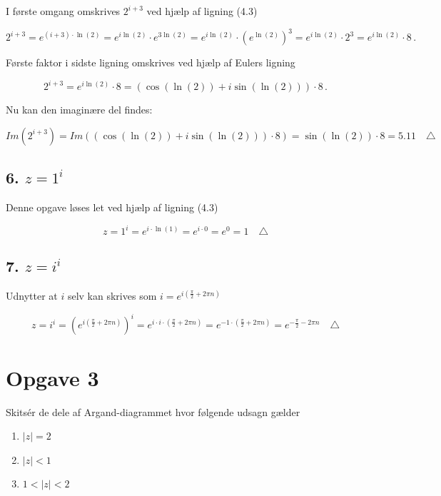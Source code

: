 \documentclass[a4paper, 12pt]{article}
\begin{document}
I første omgang omskrives \(2^{i+3}\) ved hjælp af ligning (4.3)

$$2^{i+3} = e^{(i+3) \cdot \ln(2)} = e^{i \ln(2)} \cdot e^{3 \ln(2)}=e^{i \ln(2)} \cdot \left(e^{\ln(2)}\right)^3 = e^{i\ln(2)} \cdot 2^3 =e^{i\ln(2)} \cdot 8\,.$$

Første faktor i sidste ligning omskrives ved hjælp af Eulers ligning

$$2^{i+3} = e^{i \ln(2)} \cdot 8 = \left(\cos\left(\ln(2)\right) + i \sin\left(\ln(2)\right)\right) \cdot 8 \,.$$

Nu kan den imaginære del findes:

$$Im\left(2^{i+3}\right) = Im\left( \left(\cos\left(\ln(2)\right) + i \sin\left(\ln(2)\right)\right) \cdot 8 \right) = \sin(\ln(2))\cdot 8 = 5.11\quad \triangle$$

\subsection*{6. \(z=1^i\)}
\label{sec:org3146d52}

Denne opgave løses let ved hjælp af ligning (4.3)

$$z = 1^i = e^{i \cdot \ln(1)} = e^{i \cdot 0 }= e^{0} = 1 \quad \triangle$$

\subsection*{7. \(z=i^i\)}
\label{sec:org11b6a1a}

Udnytter at \(i\) selv kan skrives som \(i=e^{i \left(\frac{\pi}{2} + 2 \pi n\right)}\)

$$z=i^i= \left(e^{i \left(\frac{\pi}{2} + 2 \pi n\right)}\right)^i = e^{i \cdot i\cdot \left( \frac{\pi}{2} + 2 \pi n\right)} = e^{-1\cdot \left( \frac{\pi}{2} + 2 \pi n\right)}=e^{-\frac{\pi}{2} - 2 \pi n}\quad \triangle$$

\section*{Opgave 3}
\label{sec:orgdac9df4}

Skitsér de dele af Argand-diagrammet hvor følgende udsagn gælder

\begin{enumerate}
\item \(|z| = 2\)
\item \(|z| < 1\)
\item \(1<|z|<2\)
\end{enumerate}
\end{document}
